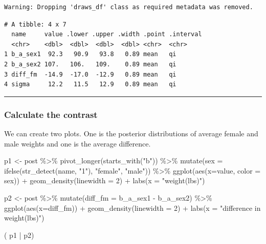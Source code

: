 \documentclass[
  letterpaper,
  DIV=11,
  numbers=noendperiod]{scrartcl}
\newenvironment{Shaded}{\begin{snugshade}}{\end{snugshade}}
\newcommand{\AttributeTok}[1]{\textcolor[rgb]{0.40,0.45,0.13}{#1}}
\newcommand{\DecValTok}[1]{\textcolor[rgb]{0.68,0.00,0.00}{#1}}
\newcommand{\FunctionTok}[1]{\textcolor[rgb]{0.28,0.35,0.67}{#1}}
\newcommand{\NormalTok}[1]{\textcolor[rgb]{0.00,0.23,0.31}{#1}}
\newcommand{\OtherTok}[1]{\textcolor[rgb]{0.00,0.23,0.31}{#1}}
\newcommand{\SpecialCharTok}[1]{\textcolor[rgb]{0.37,0.37,0.37}{#1}}
\newcommand{\StringTok}[1]{\textcolor[rgb]{0.13,0.47,0.30}{#1}}
\begin{document}
\begin{verbatim}
Warning: Dropping 'draws_df' class as required metadata was removed.
\end{verbatim}

\begin{verbatim}
# A tibble: 4 x 7
  name     value .lower .upper .width .point .interval
  <chr>    <dbl>  <dbl>  <dbl>  <dbl> <chr>  <chr>    
1 b_a_sex1  92.3   90.9   93.8   0.89 mean   qi       
2 b_a_sex2 107.   106.   109.    0.89 mean   qi       
3 diff_fm  -14.9  -17.0  -12.9   0.89 mean   qi       
4 sigma     12.2   11.5   12.9   0.89 mean   qi       
\end{verbatim}

\begin{center}\rule{0.5\linewidth}{0.5pt}\end{center}

\subsubsection{Calculate the contrast}\label{calculate-the-contrast}

We can create two plots. One is the posterior distributions of average
female and male weights and one is the average difference.

\begin{Shaded}
\begin{Highlighting}[]
\NormalTok{p1 }\OtherTok{\textless{}{-}}\NormalTok{ post }\SpecialCharTok{\%\textgreater{}\%} 
  \FunctionTok{pivot\_longer}\NormalTok{(}\FunctionTok{starts\_with}\NormalTok{(}\StringTok{"b"}\NormalTok{)) }\SpecialCharTok{\%\textgreater{}\%} 
  \FunctionTok{mutate}\NormalTok{(}\AttributeTok{sex =} \FunctionTok{ifelse}\NormalTok{(}\FunctionTok{str\_detect}\NormalTok{(name, }\StringTok{"1"}\NormalTok{), }\StringTok{"female"}\NormalTok{, }\StringTok{"male"}\NormalTok{)) }\SpecialCharTok{\%\textgreater{}\%} 
  \FunctionTok{ggplot}\NormalTok{(}\FunctionTok{aes}\NormalTok{(}\AttributeTok{x=}\NormalTok{value, }\AttributeTok{color =}\NormalTok{ sex)) }\SpecialCharTok{+}
  \FunctionTok{geom\_density}\NormalTok{(}\AttributeTok{linewidth =} \DecValTok{2}\NormalTok{) }\SpecialCharTok{+}
  \FunctionTok{labs}\NormalTok{(}\AttributeTok{x =} \StringTok{"weight(lbs)"}\NormalTok{) }

\NormalTok{p2 }\OtherTok{\textless{}{-}}\NormalTok{ post }\SpecialCharTok{\%\textgreater{}\%} 
  \FunctionTok{mutate}\NormalTok{(}\AttributeTok{diff\_fm =}\NormalTok{ b\_a\_sex1 }\SpecialCharTok{{-}}\NormalTok{ b\_a\_sex2) }\SpecialCharTok{\%\textgreater{}\%}
  \FunctionTok{ggplot}\NormalTok{(}\FunctionTok{aes}\NormalTok{(}\AttributeTok{x=}\NormalTok{diff\_fm)) }\SpecialCharTok{+}
  \FunctionTok{geom\_density}\NormalTok{(}\AttributeTok{linewidth =} \DecValTok{2}\NormalTok{) }\SpecialCharTok{+}
  \FunctionTok{labs}\NormalTok{(}\AttributeTok{x =} \StringTok{"difference in weight(lbs)"}\NormalTok{) }

\NormalTok{( p1 }\SpecialCharTok{|}\NormalTok{ p2)}
\end{Highlighting}
\end{Shaded}
\end{document}

